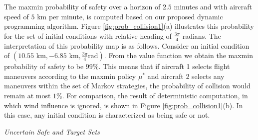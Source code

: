                 The maxmin probability of safety over a horizon of
                 $2.5$ minutes and with aircraft speed of $5$ km per
                 minute, is computed based on our proposed dynamic
                 programming algorithm. Figure
                 \ref{fig:prob_collision1}(a) illustrates this
                 probability for the set of initial conditions with
                 relative heading of $\frac{3\pi}{4}$ radians. The
                 interpretation of this probability map is as
                 follows. Consider an initial condition of $(10.55
                 \text{ km}, -6.85 \text{ km},\frac{3\pi}{4} \text{
                   rad})$. From the value function we obtain the
                 maxmin probability of safety to be $99 \%$.  This
                 means that if aircraft 1 selects flight maneuvers
                 according to the maxmin policy $\mu^*$ and aircraft 2
                 selects any maneuvers within the set of Markov
                 strategies, the probability of collision would remain
                 at most $1 \%$. For comparison, the result of
                 deterministic computation, in which wind influence is
                 ignored, is shown in Figure
                 \ref{fig:prob_collision1}(b). In this case, any
                 initial condition is characterized as being safe or
                 not.

                 \emph{Uncertain Safe and Target Sets}

